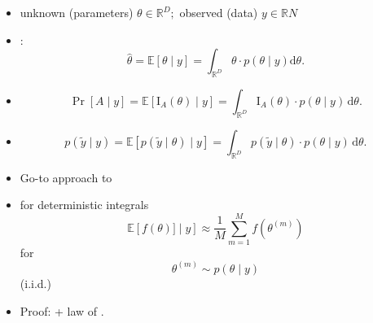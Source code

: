 \documentclass[9pt]{report}
\newcommand{\expect}[1]{\mathbb{E}\!\left[ #1 \right]}
\newcommand{\reals}{\mathbb{R}}
\newcommand{\draw}[2]{#1^{(#2)}}
\begin{document}
\sld{}
\vfill 
\begin{center}
\Huge {}
\end{center}
\vfill 
\vfill 

\begin{itemize}
\item unknown (parameters) $\theta \in \reals^D;$ \quad 
  observed (data) $y \in \reals{N}$
\item {}: 
$$
\widehat{\theta}
= \expect{\theta \mid y}
= \int_{\reals^D} \theta \cdot p(\theta \mid y) \textrm{d}\theta. 
$$
\item {}
$$
\Pr[A \mid y]
= \expect{\textrm{I}_{A}(\theta) \mid y}
= \int_{\reals^D} \textrm{I}_{A}(\theta) \cdot p(\theta \mid y) \, \textrm{d}\theta. 
$$
\item {}
$$
p(\tilde{y} \mid y) 
= \expect{p(\tilde y \mid \theta) \mid y}
= \int_{\mathbb{R}^D} p(\tilde{y} \mid \theta) \cdot p(\theta \mid 
  y) \, \textrm{d}\theta. 
$$
\end{itemize}

\begin{itemize}
\item Go-to approach to 
\item {} for deterministic integrals 
$$
\expect{f(\theta)] \mid y}
\approx \frac{1}{M} \sum_{m = 1}^M f\!\left(\draw{\theta}{m}\right) 
$$
for 
$$
\draw{\theta}{m} \sim p(\theta \mid y) 
$$
 (i.i.d.) 
\item Proof: 
  + law of . 
\end{itemize}
\end{document}
